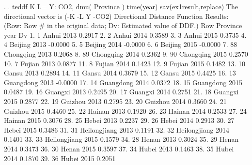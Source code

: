 . 
. teddf K L= Y: CO2, dmu( Province ) time(year) sav(ex1result,replace)
{\smallskip}
 The directional vector is (-K -L Y -CO2)
{\smallskip}
{\smallskip}
  Directional Distance Function Results:
    (Row: Row \# in the original data; Dv: Estimated value of  DDF.)
{\smallskip}
     {\TLC}
     {\VBAR} Row       Province   year        Dv {\VBAR}
     {\LFTT}
  1. {\VBAR}   1          Anhui   2013    0.2917 {\VBAR}
  2. {\VBAR}   2          Anhui   2014    0.3589 {\VBAR}
  3. {\VBAR}   3          Anhui   2015    0.3735 {\VBAR}
  4. {\VBAR}   4        Beijing   2013   -0.0000 {\VBAR}
  5. {\VBAR}   5        Beijing   2014   -0.0000 {\VBAR}
  6. {\VBAR}   6        Beijing   2015   -0.0000 {\VBAR}
  7. {\VBAR}  88      Chongqing   2013    0.2068 {\VBAR}
  8. {\VBAR}  89      Chongqing   2014    0.2362 {\VBAR}
  9. {\VBAR}  90      Chongqing   2015    0.2570 {\VBAR}
 10. {\VBAR}   7         Fujian   2013    0.0877 {\VBAR}
 11. {\VBAR}   8         Fujian   2014    0.1423 {\VBAR}
 12. {\VBAR}   9         Fujian   2015    0.1482 {\VBAR}
 13. {\VBAR}  10          Gansu   2013    0.2894 {\VBAR}
 14. {\VBAR}  11          Gansu   2014    0.3679 {\VBAR}
 15. {\VBAR}  12          Gansu   2015    0.4425 {\VBAR}
 16. {\VBAR}  13      Guangdong   2013   -0.0000 {\VBAR}
 17. {\VBAR}  14      Guangdong   2014    0.0372 {\VBAR}
 18. {\VBAR}  15      Guangdong   2015    0.0487 {\VBAR}
 19. {\VBAR}  16        Guangxi   2013    0.2495 {\VBAR}
 20. {\VBAR}  17        Guangxi   2014    0.2751 {\VBAR}
 21. {\VBAR}  18        Guangxi   2015    0.2877 {\VBAR}
 22. {\VBAR}  19        Guizhou   2013    0.2795 {\VBAR}
 23. {\VBAR}  20        Guizhou   2014    0.3660 {\VBAR}
 24. {\VBAR}  21        Guizhou   2015    0.4460 {\VBAR}
 25. {\VBAR}  22         Hainan   2013    0.1920 {\VBAR}
 26. {\VBAR}  23         Hainan   2014    0.2533 {\VBAR}
 27. {\VBAR}  24         Hainan   2015    0.3076 {\VBAR}
 28. {\VBAR}  25          Hebei   2013    0.2237 {\VBAR}
 29. {\VBAR}  26          Hebei   2014    0.2913 {\VBAR}
 30. {\VBAR}  27          Hebei   2015    0.3486 {\VBAR}
 31. {\VBAR}  31   Heilongjiang   2013    0.1191 {\VBAR}
 32. {\VBAR}  32   Heilongjiang   2014    0.1401 {\VBAR}
 33. {\VBAR}  33   Heilongjiang   2015    0.1579 {\VBAR}
 34. {\VBAR}  28          Henan   2013    0.3024 {\VBAR}
 35. {\VBAR}  29          Henan   2014    0.3473 {\VBAR}
 36. {\VBAR}  30          Henan   2015    0.3597 {\VBAR}
 37. {\VBAR}  34          Hubei   2013    0.1463 {\VBAR}
 38. {\VBAR}  35          Hubei   2014    0.1870 {\VBAR}
 39. {\VBAR}  36          Hubei   2015    0.2051 {\VBAR}
